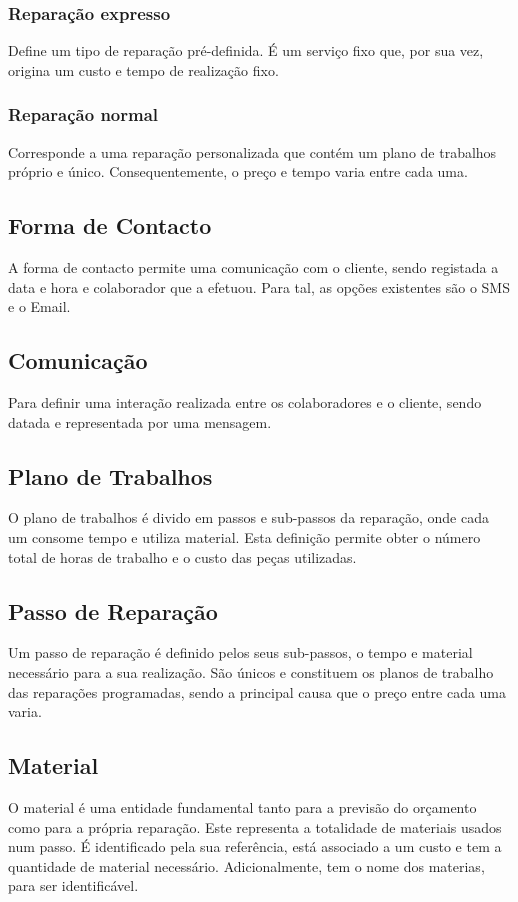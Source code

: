 \documentclass[a4paper,12pt]{scrreprt}
\begin{document}
\subsubsection{Reparação expresso} \label{ent_reparacao-expresso}
Define um tipo de reparação pré-definida.
É um serviço fixo que, por sua vez, origina um custo e tempo de realização fixo.

\subsubsection{Reparação normal} \label{ent_reparacao-normal}
Corresponde a uma reparação personalizada que contém um plano de trabalhos próprio e único.
Consequentemente, o preço e tempo varia entre cada uma.

\subsection{Forma de Contacto} \label{ent_formas-contacto}
A forma de contacto permite uma comunicação com o cliente, sendo registada a data e hora e colaborador que a efetuou.
Para tal, as opções existentes são o SMS e o Email.

\subsection{Comunicação} \label{ent_comunic}
Para definir uma interação realizada entre os colaboradores e o cliente, sendo datada e representada por uma mensagem.

\subsection{Plano de Trabalhos} \label{ent_plano-de-trabalhos}
O plano de trabalhos é divido em passos e sub-passos da reparação, onde cada um consome tempo e utiliza material. 
Esta definição permite obter o número total de horas de trabalho e o custo das peças utilizadas. 

\subsection{Passo de Reparação} \label{ent_passo_rep}
Um passo de reparação é definido pelos seus sub-passos, o tempo e material necessário para a sua realização.
São únicos e constituem os planos de trabalho das reparações programadas, sendo a principal causa que o preço 
entre cada uma varia.

\subsection{Material} \label{ent_material}
O material é uma entidade fundamental tanto para a previsão do orçamento como para a própria reparação.
Este representa a totalidade de materiais usados num passo. 
É identificado pela sua referência, está associado a um custo e tem a quantidade de material necessário. Adicionalmente,
tem o nome dos materias, para ser identificável.
\end{document}
